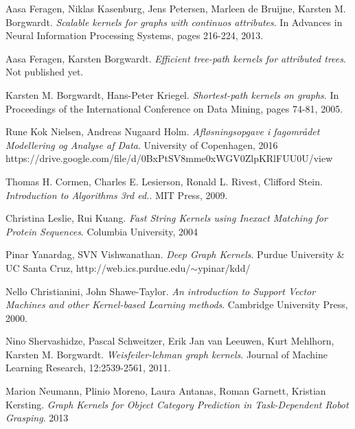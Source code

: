 \documentclass{article}
\begin{document}
\renewcommand\refname{References}
\begin{thebibliography}{9}
		Aasa Feragen, Niklas Kasenburg, Jens Petersen, Marleen de Bruijne, Karsten M. Borgwardt.
		\emph{Scalable kernels for graphs with continuos attributes}.
		In Advances in Neural Information Processing Systems, pages 216-224, 2013.

		Aasa Feragen, Karsten Borgwardt.
		\emph{Efficient tree-path kernels for attributed trees}.
		Not published yet.

		Karsten M. Borgwardt, Hans-Peter Kriegel.
		\emph{Shortest-path kernels on graphs}.
		In Proceedings of the International Conference on Data Mining, pages 74-81, 2005.
		
		Rune Kok Nielsen, Andreas Nugaard Holm.
		\emph{Afløsningsopgave i fagområdet Modellering og Analyse af Data}.
		University of Copenhagen, 2016\\
		https://drive.google.com/file/d/0BxPtSV8mme0xWGV0ZlpKRlFUU0U/view
		
		Thomas H. Cormen, Charles E. Lesierson, Ronald L. Rivest, Clifford Stein.
		\emph{Introduction to Algorithms 3rd ed.}.
		MIT Press, 2009.
		
		Christina Leslie, Rui Kuang.
		\emph{Fast String Kernels using Inexact Matching for Protein Sequences}.
		Columbia University, 2004
		
		Pinar Yanardag, SVN Vishwanathan.
		\emph{Deep Graph Kernels}.
		Purdue University \& UC Santa Cruz, http://web.ics.purdue.edu/$\sim$ypinar/kdd/
		
		Nello Christianini, John Shawe-Taylor.
		\emph{An introduction to Support Vector Machines and other Kernel-based Learning methods}.
		Cambridge University Press, 2000.
		
		Nino Shervashidze, Pascal Schweitzer, Erik Jan van Leeuwen, Kurt
		Mehlhorn, Karsten M. Borgwardt.
		\emph{Weisfeiler-lehman graph kernels}.
		Journal	of Machine Learning Research, 12:2539-2561, 2011.
		
		Marion Neumann, Plinio Moreno, Laura Antanas, Roman Garnett, Kristian Kersting.
		\emph{Graph Kernels for Object Category Prediction in Task-Dependent Robot Grasping}.
		2013
		
\end{thebibliography}
\end{document}
